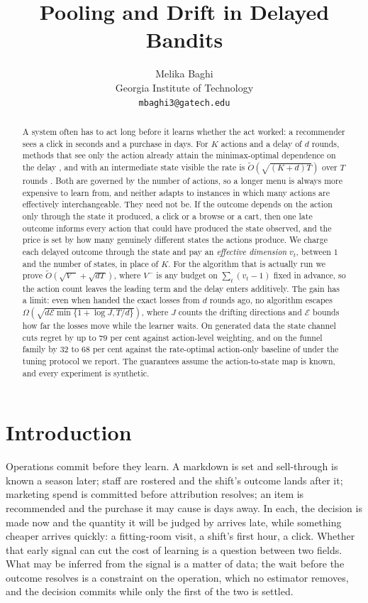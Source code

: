 \documentclass{article}
\title{Pooling and Drift in Delayed Bandits}
\author{%
  Melika Baghi \\
  Georgia Institute of Technology \\
  \texttt{mbaghi3@gatech.edu}
}
\theoremstyle{remark}
\newcommand{\Ot}{\widetilde{O}}
\begin{document}
\maketitle

\begin{abstract}
A system often has to act long before it learns whether the act worked: a recommender sees a click
in seconds and a purchase in days. For $K$ actions and a delay of $d$ rounds, methods that see only the
action already attain the minimax-optimal dependence on the delay \citep{zimmert2020}, and with an
intermediate state visible the rate is $\Ot(\sqrt{(K+d)T})$ over $T$ rounds \citep{esposito2023}.
Both are
governed by the number of actions, so a longer menu is always more expensive to learn from, and
neither adapts to instances in which many actions are effectively interchangeable. They need not
be. If the outcome depends on the action only through the state it produced, a click or a browse or
a cart, then one late outcome informs every action that could have produced the state observed, and
the price is set by how many genuinely different states the actions produce. We charge each delayed
outcome through the state and pay an \emph{effective dimension} $v_t$, between $1$ and the number of
states, in place of $K$. For the algorithm that is actually run we prove
$\Ot(\sqrt{V^-}+\sqrt{dT})$, where $V^-$ is any budget on $\sum_t(v_t-1)$ fixed in advance, so the
action count leaves the leading term and the delay enters additively. The gain has a limit: even when handed the exact losses from $d$ rounds ago, no algorithm escapes
$\Omega(\sqrt{d\mathcal E\min\{1+\log J,T/d\}})$, where $J$ counts the drifting directions and
$\mathcal E$ bounds how far the losses move while the learner waits. On generated data the state
channel cuts regret by up to $79$ per cent against action-level weighting, and on the funnel family
by $32$ to $68$ per cent against the rate-optimal action-only baseline of \citet{zimmert2020}
under the tuning protocol we report. The
guarantees assume the action-to-state map is known, and every experiment is synthetic.
\end{abstract}

\section{Introduction}

Operations commit before they learn. A markdown is set and sell-through is known a season later;
staff are rostered and the shift's outcome lands after it; marketing spend is committed before
attribution resolves; an item is recommended and the purchase it may cause is days away. In each,
the decision is made now and the quantity it will be judged by arrives late, while something
cheaper arrives quickly: a fitting-room visit, a shift's first hour, a click. Whether that early
signal can cut the cost of learning is a question between two fields. What may be inferred from the
signal is a matter of data; the wait before the outcome resolves is a constraint on the operation,
which no estimator removes, and the decision commits while only the first of the two is settled.
\end{document}
